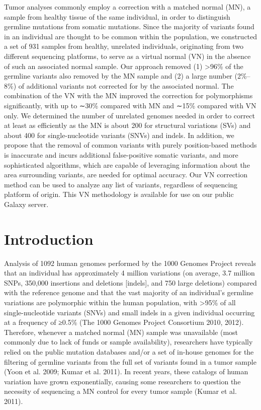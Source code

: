 Tumor analyses commonly employ a correction with a matched normal (MN), a sample from healthy tissue of the same individual, in order to distinguish germline mutations from somatic mutations. Since the majority of variants found in an individual are thought to be common within the population, we constructed a set of 931 samples from healthy, unrelated individuals, originating from two different sequencing platforms, to serve as a virtual normal (VN) in the absence of such an associated normal sample. Our approach removed (1) >96\% of the germline variants also removed by the MN sample and (2) a large number (2\%–8\%) of additional variants not corrected for by the associated normal. The combination of the VN with the MN improved the correction for polymorphisms significantly, with up to ∼30\% compared with MN and ∼15\% compared with VN only. We determined the number of unrelated genomes needed in order to correct at least as efficiently as the MN is about 200 for structural variations (SVs) and about 400 for single-nucleotide variants (SNVs) and indels. In addition, we propose that the removal of common variants with purely position-based methods is inaccurate and incurs additional false-positive somatic variants, and more sophisticated algorithms, which are capable of leveraging information about the area surrounding variants, are needed for optimal accuracy. Our VN correction method can be used to analyze any list of variants, regardless of sequencing platform of origin. This VN methodology is available for use on our public Galaxy server.

\section*{Introduction}

Analysis of 1092 human genomes performed by the 1000 Genomes Project reveals that an individual has approximately 4 million variations (on average, 3.7 million SNPs, 350,000 insertions and deletions [indels], and 750 large deletions) compared with the reference genome and that the vast majority of an individual's germline variations are polymorphic within the human population, with >95\% of all single-nucleotide variants (SNVs) and small indels in a given individual occurring at a frequency of ≥0.5\% (The 1000 Genomes Project Consortium 2010, 2012). Therefore, whenever a matched normal (MN) sample was unavailable (most commonly due to lack of funds or sample availability), researchers have typically relied on the public mutation databases and/or a set of in-house genomes for the filtering of germline variants from the full set of variants found in a tumor sample (Yoon et al. 2009; Kumar et al. 2011). In recent years, these catalogs of human variation have grown exponentially, causing some researchers to question the necessity of sequencing a MN control for every tumor sample (Kumar et al. 2011).

